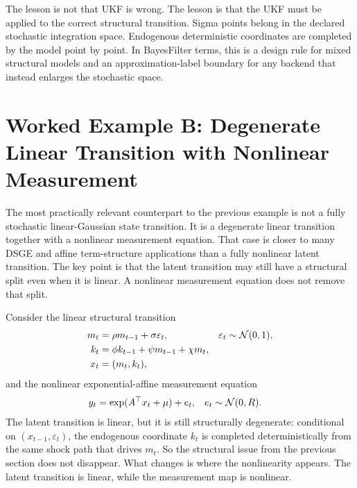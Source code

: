 The lesson is not that UKF is wrong.  The lesson is that the UKF must be
applied to the correct structural transition.  Sigma points belong in the
declared stochastic integration space.  Endogenous deterministic coordinates
are completed by the model point by point.  In BayesFilter terms, this is a
design rule for mixed structural models and an approximation-label boundary for
any backend that instead enlarges the stochastic space.

\section[Degenerate Linear Transition Example]{Worked Example B: Degenerate Linear Transition with Nonlinear Measurement}
\label{sec:bf-structural-nonlinear-measurement}

The most practically relevant counterpart to the previous example is not a fully
stochastic linear-Gaussian state transition.  It is a degenerate linear
transition together with a nonlinear measurement equation.  That case is closer
to many DSGE and affine term-structure applications than a fully nonlinear
latent transition.  The key point is that the latent transition may still have a
structural split even when it is linear.  A nonlinear measurement equation does
not remove that split.

Consider the linear structural transition
\begin{align}
  m_t &= \rho m_{t-1} + \sigma\varepsilon_t,
    & \varepsilon_t &\sim \mathcal{N}(0,1),
    \label{eq:bf-exp-affine-transition-m}\\
  k_t &= \phi k_{t-1} + \psi m_{t-1} + \chi m_t,
    \label{eq:bf-exp-affine-transition-k}\\
  x_t &= (m_t,k_t),
    \label{eq:bf-exp-affine-transition-state}
\end{align}
and the nonlinear exponential-affine measurement equation
\begin{align}
  y_t &= \exp(A^\top x_t + \mu) + e_t,
    & e_t &\sim \mathcal{N}(0,R).
    \label{eq:bf-exp-affine-observation}
\end{align}
The latent transition is linear, but it is still structurally degenerate:
conditional on $(x_{t-1},\varepsilon_t)$, the endogenous coordinate $k_t$ is
completed deterministically from the same shock path that drives $m_t$.  So the
structural issue from the previous section does not disappear.  What changes is
where the nonlinearity appears.  The latent transition is linear, while the
measurement map is nonlinear.

